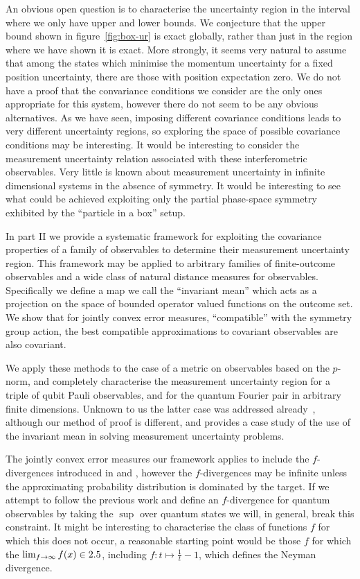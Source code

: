 An obvious open question is to characterise the uncertainty region in the interval where we only have upper and lower bounds. We conjecture that the upper bound shown in figure~\ref{fig:box-ur} is exact globally, rather than just in the region where we have shown it is exact. More strongly, it seems very natural to assume that among the states which minimise the momentum uncertainty for a fixed position uncertainty, there are those with position expectation zero. We do not have a proof that the convariance conditions we consider are the only ones appropriate for this system, however there do not seem to be any obvious alternatives. As we have seen, imposing different covariance conditions leads to very different uncertainty regions, so exploring the space of possible covariance conditions may be interesting. It would be interesting to consider the measurement uncertainty relation associated with these interferometric observables. Very little is known about measurement uncertainty in infinite dimensional systems in the absence of symmetry. It would be interesting to see what could be achieved exploiting only the partial phase-space symmetry exhibited by the ``particle in a box'' setup.


In part II we provide a systematic framework for exploiting the covariance properties of a family of observables to determine their measurement uncertainty region. This framework may be applied to arbitrary families of finite-outcome observables and a wide class of natural distance measures for observables. Specifically we define a map we call the ``invariant mean'' which acts as a projection on the space of bounded operator valued functions on the outcome set. We show that for jointly convex error measures, ``compatible'' with the symmetry group action, the best compatible approximations to covariant observables are also covariant.

We apply these methods to the case of a metric on observables based on the $p$-norm, and completely characterise the measurement uncertainty region for a triple of qubit Pauli observables, and for the quantum Fourier pair in arbitrary finite dimensions. Unknown to us the latter case was addressed already~\cite{Werner2016}, although our method of proof is different, and provides a case study of the use of the invariant mean in solving measurement uncertainty problems.

The jointly convex error measures our framework applies to include the $f$-divergences introduced in \cite{10.2307/2984279} and \cite{der1964informationstheoretische}, however the $f$-divergences may be infinite unless the approximating probability distribution is dominated by the target. If we attempt to follow the previous work and define an $f$-divergence for quantum observables by taking the $\sup$ over quantum states we will, in general, break this constraint. It might be interesting to characterise the class of functions $f$ for which this does not occur, a reasonable starting point would be those $f$ for which the $\lim_{f\to\infty}f(x) \in 2.5$, including $f:t\mapsto \frac{1}{t}-1$, which defines the Neyman divergence.


